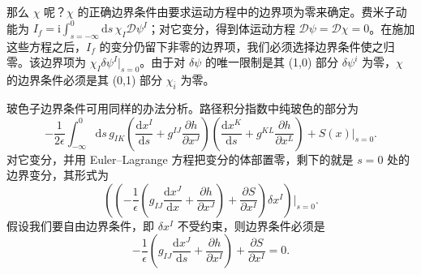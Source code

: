 \documentclass[11pt,a4paper,UTF8]{ctexart}
\theoremstyle{plain}
\theoremstyle{definition}
\begin{document}

那么 $\chi$ 呢？$\chi$ 的正确边界条件由要求运动方程中的边界项为零来确定。费米子动能为 $I_f=\mathrm{i}\int^{0}_{s=-\infty}\mathrm{d}s\,\chi_I\mathcal{D}\psi^I$；对它变分，得到体运动方程 $\mathcal{D}\psi=\mathcal{D}\chi=0$。在施加这些方程之后，$I_f$ 的变分仍留下非零的边界项，我们必须选择边界条件使之归零。该边界项为 $\chi_I\delta\psi^I|_{s=0}$。由于对 $\delta\psi$ 的唯一限制是其 (1,0) 部分 $\delta\psi^i$ 为零，$\chi$ 的边界条件必须是其 (0,1) 部分 $\chi_{\bar i}$ 为零。

玻色子边界条件可用同样的办法分析。路径积分指数中纯玻色的部分为
\begin{equation}
    -\frac{1}{2\epsilon}\int_{-\infty}^{0}\mathrm{d}s\,g_{IK}
    \left(\frac{\mathrm{d}x^I}{\mathrm{d}s}
    +g^{IJ}\frac{\partial h}{\partial x^J}\right)
    \left(\frac{\mathrm{d}x^K}{\mathrm{d}s}
    +g^{KL}\frac{\partial h}{\partial x^L}\right)
    +S(x)|_{s=0}.
    \tag{4.23}
\end{equation}
对它变分，并用 Euler--Lagrange 方程把变分的体部置零，剩下的就是 $s=0$ 处的边界变分，其形式为
\begin{equation}
    \left(\left(-\frac{1}{\epsilon}
    \left(g_{IJ}\frac{\mathrm{d}x^J}{\mathrm{d}x}
    +\frac{\partial h}{\partial x^J}\right)
    +\frac{\partial S}{\partial x^I}\right)\delta x^I\right)\Big|_{s=0}.
    \tag{4.24}
\end{equation}
假设我们要自由边界条件，即 $\delta x^I$ 不受约束，则边界条件必须是
\begin{equation}
    -\frac{1}{\epsilon}\left(g_{IJ}\frac{\mathrm{d}x^J}{\mathrm{d}s}
    +\frac{\partial h}{\partial x^I}\right)
    +\frac{\partial S}{\partial x^I}=0.
    \tag{4.25}
\end{equation}

\end{document}
